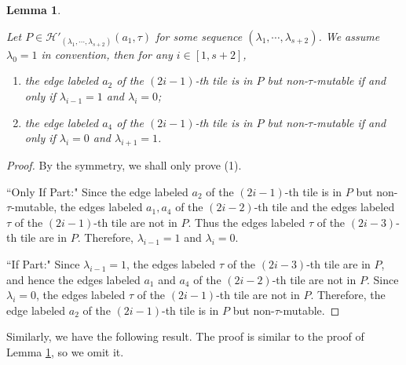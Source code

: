 \documentclass[10pt]{amsart}
\theoremstyle{theorems}
\newtheorem{Lemma}[Theorem]{Lemma}
\begin{document}
\begin{Lemma}\label{non-tau-mu1}

Let $P\in \mathcal H'_{(\lambda_1,\cdots,\lambda_{s+2})}(a_1,\tau)$ for some sequence $(\lambda_1,\cdots,\lambda_{s+2})$. We assume $\lambda_{0}=1$ in convention, then for any $i\in [1,s+2]$,

 \begin{enumerate}[$(1)$]

   \item the edge labeled $a_2$ of the $(2i-1)$-th tile is in $P$ but non-$\tau$-mutable if and only if $\lambda_{i-1}=1$ and $\lambda_i=0$;

   \item the edge labeled $a_4$ of the $(2i-1)$-th tile is in $P$ but non-$\tau$-mutable if and only if $\lambda_{i}=0$ and $\lambda_{i+1}=1$.

 \end{enumerate}


\end{Lemma}

\begin{proof}

By the symmetry, we shall only prove (1).

``Only If Part:"
Since the edge labeled $a_2$ of the $(2i-1)$-th tile is in $P$ but non-$\tau$-mutable, the edges labeled $a_1,a_4$ of the $(2i-2)$-th tile and the edges labeled $\tau$ of the $(2i-1)$-th tile are not in $P$. Thus the edges labeled $\tau$ of the $(2i-3)$-th tile are in $P$. Therefore, $\lambda_{i-1}=1$ and $\lambda_i=0$.


``If Part:" Since $\lambda_{i-1}=1$, the edges labeled $\tau$ of the $(2i-3)$-th tile are in $P$, and hence the edges labeled $a_1$ and $a_4$ of the $(2i-2)$-th tile are not in $P$. Since $\lambda_i=0$, the edges labeled $\tau$ of the $(2i-1)$-th tile are not in $P$. Therefore, the edge labeled $a_2$ of the $(2i-1)$-th tile is in $P$ but non-$\tau$-mutable.
\end{proof}

\medskip

Similarly, we have the following result. The proof is similar to the proof of Lemma \ref{non-tau-mu1}, so we omit it.

\medskip
\end{document}

